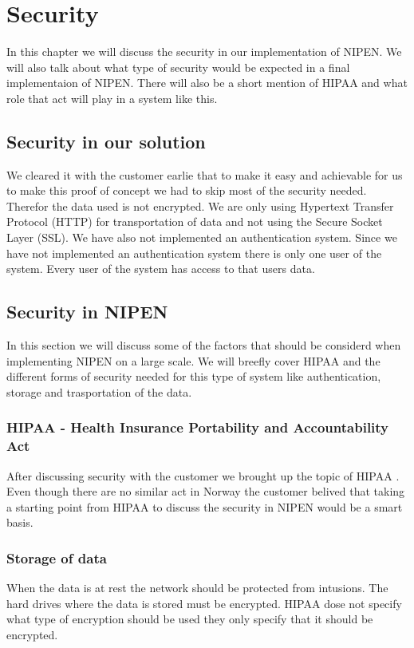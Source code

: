 \chapter{Security} 
\label{ch:security}


In this chapter we will discuss the security in our implementation of NIPEN.
We will also talk about what type of security would be expected in a final implementaion of NIPEN. There will also be a short mention of HIPAA and what role that act will play in a system like this.

\section{Security in our solution}
We cleared it with the customer earlie that to make it easy and achievable for us to make this proof of concept we had to skip most of the security needed.
Therefor the data used is not encrypted. 
We are only using Hypertext Transfer Protocol (HTTP) for transportation of data and not using the Secure Socket Layer (SSL).  
We have also not implemented an authentication system.
Since we have not implemented an authentication system there is only one user of the system.
Every user of the system has access to that users data.

\section{Security in NIPEN}

In this section we will discuss some of the factors that should be considerd when implementing NIPEN on a large scale.
We will breefly cover HIPAA and the different forms of security needed for this type of system like authentication, storage and trasportation of the data.


\subsection{HIPAA - Health Insurance Portability and Accountability Act}

After discussing security with the customer we brought up the topic of HIPAA \cite{HIPAA}. 
Even though there are no similar act in Norway the customer belived that taking a starting point from HIPAA to discuss the security in NIPEN would be a smart basis. 

\subsection{Storage of data}
When the data is at rest the network should be protected from intusions.
The hard drives where the data is stored must be encrypted. \cite{Encryption}
HIPAA dose not specify what type of encryption should be used they only specify that it should be encrypted.

